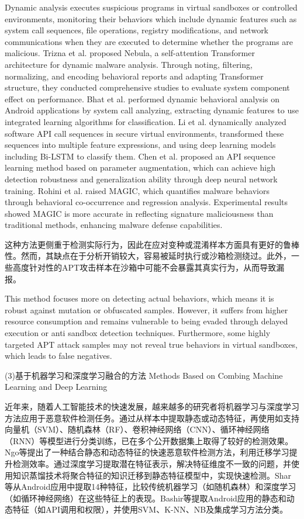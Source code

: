 Dynamic analysis executes suspicious programs in virtual sandboxes or controlled environments, monitoring their behaviors which include dynamic features such as system call sequences, file operations, registry modifications, and network communications when they are executed to determine whether the programs are malicious. Trizna et al. proposed Nebula, a self-attention Transformer architecture for dynamic malware analysis\cite{trizna2024nebula}. Through noting, filtering, normalizing, and encoding behavioral reports and adapting Transformer structure, they conducted comprehensive studies to evaluate system component effect on performance. Bhat et al. performed dynamic behavioral analysis on Android applications by system call analyzing, extracting dynamic features to use integrated learning algorithms for classification\cite{bhat2023system}. Li et al. dynamically analyzed software API call sequences in secure virtual environments, transformed these sequences into multiple feature expressions, and using deep learning models including Bi-LSTM to classify them\cite{li2022novel}. Chen et al. proposed an API sequence learning method based on parameter augmentation, which can achieve high detection robustness and generalization ability through deep neural network training\cite{chen2022cruparamer}. Rohini et al. raised MAGIC, which quantifies malware behaviors through behavioral co-occurrence and regression analysis\cite{rohini2024magic}. Experimental results showed MAGIC is more accurate in reflecting signature maliciousness than traditional methods, enhancing malware defense capabilities.

这种方法更侧重于检测实际行为，因此在应对变种或混淆样本方面具有更好的鲁棒性。然而，其缺点在于分析开销较大，容易被延时执行或沙箱检测绕过。此外，一些高度针对性的APT攻击样本在沙箱中可能不会暴露其真实行为，从而导致漏报。

This method focuses more on detecting actual behaviors, which means it is robust against mutation or obfuscated samples. However, it suffers from higher resource consumption and remains vulnerable to being evaded through delayed execution or anti sandbox detection techniques. Furthermore, some highly targeted APT attack samples may not reveal true behaviors in virtual sandboxes, which leads to false negatives.

(3)基于机器学习和深度学习融合的方法 Methods Based on Combing Machine Learning and Deep Learning

近年来，随着人工智能技术的快速发展，越来越多的研究者将机器学习与深度学习方法应用于恶意软件检测任务。通过从样本中提取静态或动态特征，再使用如支持向量机（SVM）、随机森林（RF）、卷积神经网络（CNN）、循环神经网络（RNN）等模型进行分类训练，已在多个公开数据集上取得了较好的检测效果。Ngo等\cite{ngo2023fast}提出了一种结合静态和动态特征的快速恶意软件检测方法，利用迁移学习提升检测效率。通过深度学习提取潜在特征表示，解决特征维度不一致的问题，并使用知识蒸馏技术将聚合特征的知识迁移到静态特征模型中，实现快速检测。Shar等\cite{shar2023experimental}从Android应用中提取14种特征，比较传统机器学习（如随机森林）和深度学习（如循环神经网络）在这些特征上的表现。Bashir等\cite{bashir2024hybrid}提取Android应用的静态和动态特征（如API调用和权限），并使用SVM、K-NN、NB及集成学习方法分类。

